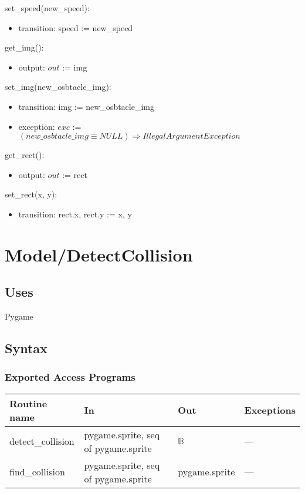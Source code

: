 \documentclass[12pt]{article}
\begin{document}
\noindent set\_speed(new\_speed):
\begin{itemize}
    \item transition: speed := new\_speed
\end{itemize}


\noindent get\_img():
\begin{itemize}
    \item output: $out$ := img 
\end{itemize}


\noindent set\_img(new\_osbtacle\_img):
\begin{itemize}
    \item transition: img := new\_osbtacle\_img
    \item exception: $exc$ := $(new\_osbtacle\_img \equiv NULL) \Rightarrow IllegalArgumentException $
\end{itemize}

\noindent get\_rect():
\begin{itemize}
    \item output: $out$ := rect 
\end{itemize}


\noindent set\_rect(x, y):
\begin{itemize}
    \item transition: rect.x, rect.y := x, y
\end{itemize}



\newpage
\section*{Model/DetectCollision}

\subsection* {Uses}

Pygame

\subsection* {Syntax}

\subsubsection* {Exported Access Programs}

\begin{tabular}{| l | l | l | l |}
\hline
\textbf{Routine name} & \textbf{In} & \textbf{Out} & \textbf{Exceptions}\\
\hline
    detect\_collision & pygame.sprite, seq of pygame.sprite & $\mathbb{B}$  & ---\\
\hline
    find\_collision & pygame.sprite, seq of pygame.sprite & pygame.sprite  & ---\\
\hline
\end{tabular}
\end{document}
